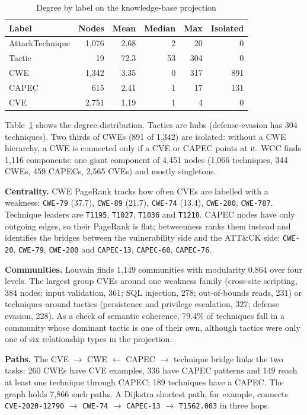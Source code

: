 \documentclass[conference]{IEEEtran}
\newcommand{\id}[1]{\texttt{#1}}
\begin{document}
\begin{table}[t]
\caption{Degree by label on the knowledge-base projection}
\label{tab:degree}
\centering
\footnotesize
\begin{tabular}{@{}l r r r r r@{}}
\toprule
Label & Nodes & Mean & Median & Max & Isolated \\
\midrule
AttackTechnique & 1,076 & 2.68 & 2 & 20 & 0 \\
Tactic & 19 & 72.3 & 53 & 304 & 0 \\
CWE & 1,342 & 3.35 & 0 & 317 & 891 \\
CAPEC & 615 & 2.41 & 1 & 17 & 131 \\
CVE & 2,751 & 1.19 & 1 & 4 & 0 \\
\bottomrule
\end{tabular}
\end{table}

Table~\ref{tab:degree} shows the degree distribution. Tactics are hubs (defense-evasion has 304 techniques). Two thirds of CWEs (891 of 1,342) are isolated: without a CWE hierarchy, a CWE is connected only if a CVE or CAPEC points at it. WCC finds 1,116 components: one giant component of 4,451 nodes (1,066 techniques, 344 CWEs, 459 CAPECs, 2,565 CVEs) and mostly singletons.

\textbf{Centrality.} CWE PageRank tracks how often CVEs are labelled with a weakness: \id{CWE-79} (37.7), \id{CWE-89} (21.7), \id{CWE-74} (13.4), \id{CWE-200}, \id{CWE-787}. Technique leaders are \id{T1195}, \id{T1027}, \id{T1036} and \id{T1218}. CAPEC nodes have only outgoing edges, so their PageRank is flat; betweenness ranks them instead and identifies the bridges between the vulnerability side and the ATT\&CK side: \id{CWE-20}, \id{CWE-79}, \id{CWE-200} and \id{CAPEC-13}, \id{CAPEC-60}, \id{CAPEC-76}.

\textbf{Communities.} Louvain finds 1,149 communities with modularity 0.864 over four levels. The largest group CVEs around one weakness family (cross-site scripting, 384 nodes; input validation, 361; SQL injection, 278; out-of-bounds reads, 231) or techniques around tactics (persistence and privilege escalation, 327; defense evasion, 228). As a check of semantic coherence, 79.4\% of techniques fall in a community whose dominant tactic is one of their own, although tactics were only one of six relationship types in the projection.

\textbf{Paths.} The CVE $\rightarrow$ CWE $\leftarrow$ CAPEC $\rightarrow$ technique bridge links the two tasks: 260 CWEs have CVE examples, 336 have CAPEC patterns and 149 reach at least one technique through CAPEC; 189 techniques have a CAPEC. The graph holds 7,866 such paths. A Dijkstra shortest path, for example, connects \id{CVE-2020-12790} $\rightarrow$ \id{CWE-74} $\rightarrow$ \id{CAPEC-13} $\rightarrow$ \id{T1562.003} in three hops.
\end{document}
